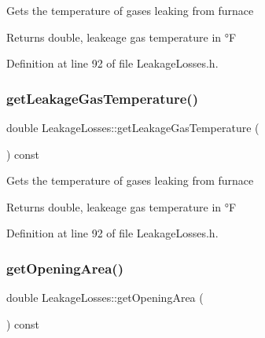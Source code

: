 Gets the temperature of gases leaking from furnace \begin{DoxyReturn}{Returns}
double, leakeage gas temperature in °F 
\end{DoxyReturn}


Definition at line 92 of file Leakage\+Losses.\+h.

\mbox{\label{class_leakage_losses_a5dbb249c07bc91611b71d62610af7234}} 
\subsubsection{\texorpdfstring{get\+Leakage\+Gas\+Temperature()}{getLeakageGasTemperature()}\hspace{0.1cm}{\footnotesize\ttfamily [3/3]}}
{\footnotesize\ttfamily double Leakage\+Losses\+::get\+Leakage\+Gas\+Temperature (\begin{DoxyParamCaption}{ }\end{DoxyParamCaption}) const\hspace{0.3cm}{\ttfamily [inline]}}

Gets the temperature of gases leaking from furnace \begin{DoxyReturn}{Returns}
double, leakeage gas temperature in °F 
\end{DoxyReturn}


Definition at line 92 of file Leakage\+Losses.\+h.

\mbox{\label{class_leakage_losses_a6b31fbefaa16a5a52ce423b9531e84fa}} 
\subsubsection{\texorpdfstring{get\+Opening\+Area()}{getOpeningArea()}\hspace{0.1cm}{\footnotesize\ttfamily [1/3]}}
{\footnotesize\ttfamily double Leakage\+Losses\+::get\+Opening\+Area (\begin{DoxyParamCaption}{ }\end{DoxyParamCaption}) const\hspace{0.3cm}{\ttfamily [inline]}}

